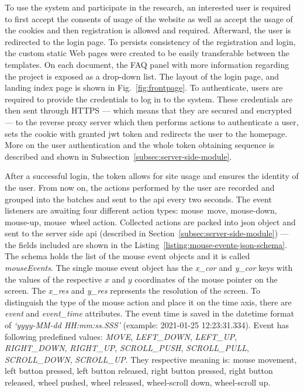 To use the system and participate in the research, an interested user is required to first accept the consents of usage of the website as well as accept the usage of the cookies and then registration is allowed and required. Afterward, the user is redirected to the login page.
To persists consistency of the registration and login, the custom static Web pages were created to be easily transferable between the templates.
On each document, the FAQ panel with more information regarding the project is exposed as a drop-down list.
The layout of the login page, and landing index page is shown in Fig.~\ref{fig:frontpage}.
To authenticate, users are required to provide the credentials to log in to the system.
These credentials are then sent through HTTPS --- which means that they are secured and encrypted --- to the reverse proxy server which then performs actions to authenticate a user, sets the cookie with granted \gls{jwt} token and redirects the user to the homepage.
More on the user authentication and the whole token obtaining sequence is described and shown in Subsection~\ref{subsec:server-side-module}.

After a successful login, the token allows for site usage and ensures the identity of the user.
From now on, the actions performed by the user are recorded and grouped into the batches and sent to the \gls{api} every two seconds.
The event listeners are awaiting four different action types: \mbox{mouse move}, \mbox{mouse-down}, \mbox{mouse-up}, \mbox{mouse wheel} action.
Collected actions are packed into \gls{json} object and sent to the server side \gls{api} (described in Section~\ref{subsec:server-side-module}) --- the fields included are shown in the Listing~\ref{listing:mouse-events-json-schema}.
The schema holds the list of the mouse event objects and it is called \textit{mouseEvents}.
The single mouse event object has the \textit{x\_cor} and \textit{y\_cor} keys with the values of the respective $x$ and $y$ coordinates of the mouse pointer on the screen.
The \textit{x\_res} and \textit{y\_res} represents the resolution of the screen.
To distinguish the type of the mouse action and place it on the time axis, there are \textit{event} and \textit{event\_time} attributes.
The event time is saved in the datetime format of \textit{`yyyy-MM-dd HH:mm:ss.SSS'} (example: 2021-01-25 12:23:31.334).
Event has following predefined values: \textit{MOVE}, \textit{LEFT\_DOWN}, \textit{LEFT\_UP}, \textit{RIGHT\_DOWN}, \textit{RIGHT\_UP}, \textit{SCROLL\_PUSH}, \textit{SCROLL\_PULL}, \textit{SCROLL\_DOWN}, \textit{SCROLL\_UP}\@.
They respective meaning is: mouse movement, left button pressed, left button released, right button pressed, right button released, wheel pushed, wheel released, wheel-scroll down, wheel-scroll up.



